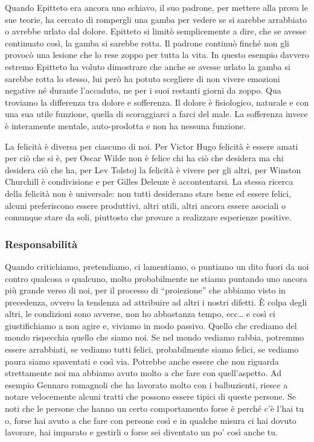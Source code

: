 \documentclass[12pt]{book} %
\begin{document}
Quando Epitteto era ancora uno schiavo, il suo padrone, per mettere alla prova le sue teorie, ha cercato di rompergli
una gamba per vedere se si sarebbe arrabbiato o avrebbe urlato dal dolore. Epitteto si limitò semplicemente a dire, che
se avesse continuato così, la gamba si sarebbe rotta. Il padrone continuò finché non gli provocò una lesione che lo
rese zoppo per tutta la vita. In questo esempio davvero estremo Epitteto ha voluto dimostrare che anche se avesse
urlato la gamba si sarebbe rotta lo stesso, lui però ha potuto scegliere di non vivere emozioni negative né durante
l'accaduto, ne per i suoi restanti giorni da zoppo. Qua troviamo la differenza tra dolore e
sofferenza. Il dolore è fisiologico, naturale e con una sua utile funzione, quella di scoraggiarci a farci del male. La
sofferenza invece è interamente mentale, auto-prodotta e non ha nessuna funzione.

La felicità è diversa per ciascuno di noi. Per Victor Hugo felicità è essere amati per ciò che si è, per Oscar Wilde non
è felice chi ha ciò che desidera ma chi desidera ciò che ha, per Lev Tolstoj la felicità è vivere per gli altri, per
Winston Churchill è condivisione e per Gilles Deleuze è accontentarsi. La stessa ricerca della felicità non è
universale: non tutti desiderano stare bene ed essere felici, alcuni preferiscono essere produttivi, altri utili, altri
ancora essere asociali o comunque stare da soli, piuttosto che provare a realizzare esperienze
positive.

\subsubsection{Responsabilità}
Quando critichiamo, pretendiamo, ci
lamentiamo, o puntiamo un dito fuori da noi contro qualcosa o qualcuno, molto probabilmente ne stiamo puntando uno
ancora più grande verso di noi, per il processo di “proiezione” che abbiamo visto in precedenza, ovvero la tendenza ad
attribuire ad altri i nostri difetti. È colpa degli altri, le condizioni sono avverse, non ho abbastanza tempo, ecc… e
così ci giustifichiamo a non agire e, viviamo in modo passivo. Quello che crediamo del mondo rispecchia quello che
siamo noi. Se nel mondo vediamo rabbia, potremmo essere arrabbiati, se vediamo tutti felici, probabilmente siamo
felici, se vediamo paura siamo spaventati e così via. Potrebbe anche essere che non riguarda strettamente noi ma abbiamo avuto molto a che fare con quell'aspetto. Ad esempio Gennaro romagnoli che ha lavorato molto con i balbuzienti, riesce a notare velocemente alcuni tratti che possono essere tipici di queste persone. Se noti che le persone che hanno un certo comportamento forse è perché c'è l'hai tu o, forse hai avuto a che fare con persone così e in qualche misura ci hai dovuto lavorare, hai imparato e gestirli o forse sei diventato un po' così anche tu.
\end{document}
